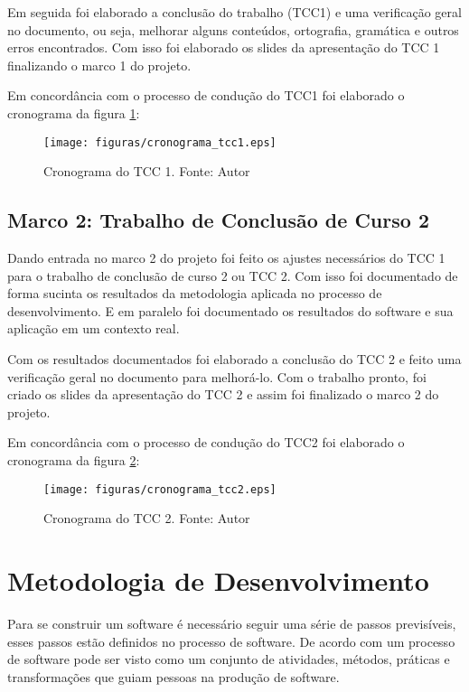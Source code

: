 Em seguida foi elaborado a conclusão do trabalho (TCC1) e uma verificação geral no documento, ou seja, melhorar alguns
conteúdos, ortografia, gramática e outros erros encontrados. Com isso foi elaborado os slides da apresentação do TCC 1
finalizando o marco 1 do projeto.

Em concordância com o processo de condução do TCC1 foi elaborado o cronograma da figura \ref{fig:cronograma_tcc1}:

\begin{figure}[!ht]
  \centering
  \texttt{[image: figuras/cronograma\_tcc1.eps]}
  \caption[Cronograma do TCC 1.]{Cronograma do TCC 1. Fonte: Autor}
  \label{fig:cronograma_tcc1}
\end{figure}

\subsection{Marco 2: Trabalho de Conclusão de Curso 2}

Dando entrada no marco 2 do projeto foi feito os ajustes necessários do TCC 1 para o trabalho de conclusão de curso 2
ou TCC 2. Com isso foi documentado de forma sucinta os resultados da metodologia aplicada no processo de
desenvolvimento. E em paralelo foi documentado os resultados do software e sua aplicação em um contexto real.

Com os resultados documentados foi elaborado a conclusão do TCC 2 e feito uma verificação geral no
documento para melhorá-lo. Com o trabalho pronto, foi criado os slides da apresentação do TCC 2 e
assim foi finalizado o marco 2 do projeto.

Em concordância com o processo de condução do TCC2 foi elaborado o cronograma da figura \ref{fig:cronograma_tcc2}:

\begin{figure}[h!]
  \centering
  \texttt{[image: figuras/cronograma\_tcc2.eps]}
  \caption[Cronograma do TCC 2.]{Cronograma do TCC 2. Fonte: Autor}
  \label{fig:cronograma_tcc2}
\end{figure}

\section{Metodologia de Desenvolvimento}

Para se construir um software é necessário seguir uma série de passos previsíveis, esses passos estão definidos no processo de software. De acordo com \cite{pressman} um processo de software pode ser visto como um conjunto de atividades, métodos, práticas e transformações que guiam pessoas na produção de software.

